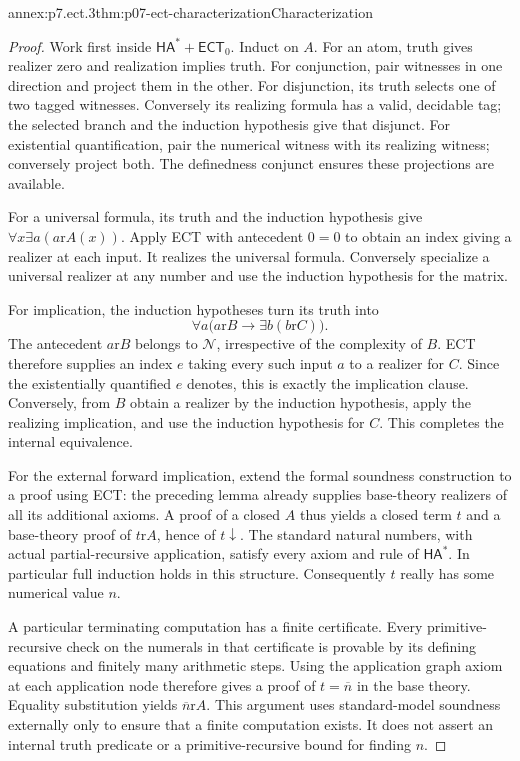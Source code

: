 \begin{annexitem}{annex:p7.ect.3}{thm:p07-ect-characterization}{Characterization}
\begin{proof}
Work first inside \(\mathsf{HA}^{\ast}+\mathsf{ECT}_0\).
Induct on \(A\). For an atom, truth gives realizer zero and
realization implies truth. For conjunction, pair witnesses in one
direction and project them in the other. For disjunction, its truth
selects one of two tagged witnesses. Conversely its realizing formula
has a valid, decidable tag; the selected branch and the induction
hypothesis give that disjunct. For existential quantification, pair
the numerical witness with its realizing witness; conversely project
both. The definedness conjunct ensures these projections are available.

For a universal formula, its truth and the induction hypothesis give
\(\forall x\exists a(a\mathrel{\mathrm r}A(x))\).
Apply ECT with antecedent \(0=0\) to obtain an index giving a
realizer at each input. It realizes the universal formula. Conversely
specialize a universal realizer at any number and use the induction
hypothesis for the matrix.

For implication, the induction hypotheses turn its truth into
\[
 \forall a\bigl(a\mathrel{\mathrm r}B\to
                       \exists b(b\mathrel{\mathrm r}C)\bigr).
\]
The antecedent \(a\mathrel{\mathrm r}B\) belongs to
\(\mathcal N\), irrespective of the complexity of \(B\).
ECT therefore supplies an index \(e\) taking every such input
\(a\) to a realizer for \(C\). Since the existentially
quantified \(e\) denotes, this is exactly the implication clause.
Conversely, from \(B\) obtain a realizer by the induction
hypothesis, apply the realizing implication, and use the induction
hypothesis for \(C\). This completes the internal equivalence.

For the external forward implication, extend the formal soundness
construction to a proof using ECT: the preceding lemma already supplies
base-theory realizers of all its additional axioms. A proof of a closed
\(A\) thus yields a closed term \(t\) and a base-theory proof
of \(t\mathrel{\mathrm r}A\), hence of \(t\downarrow\).
The standard natural numbers, with actual partial-recursive application,
satisfy every axiom and rule of \(\mathsf{HA}^{\ast}\).
In particular full induction holds in this structure. Consequently
\(t\) really has some numerical value \(n\).

A particular terminating computation has a finite certificate.
Every primitive-recursive check on the numerals in that certificate
is provable by its defining equations and finitely many arithmetic
steps. Using the application graph axiom at each application node
therefore gives a proof of \(t=\overline n\) in the base theory.
Equality substitution yields
\(\overline n\mathrel{\mathrm r}A\).
This argument uses standard-model soundness externally only to ensure
that a finite computation exists. It does not assert an internal
truth predicate or a primitive-recursive bound for finding \(n\).


\end{proof}
\end{annexitem}
